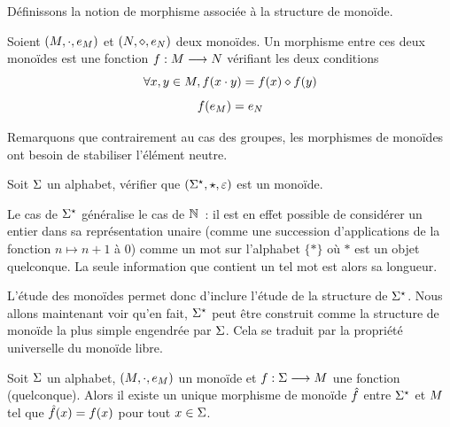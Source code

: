 \noindent
Définissons la notion de morphisme associée à la structure de monoïde.

\begin{definition}
  Soient $(M,\mathbin{\cdot},e_{M})$ et $(N,\mathbin{\diamond},e_{N})$ deux monoïdes. Un
  morphisme entre ces deux monoïdes est une fonction
  $f : \displaystyle M \longrightarrow N$ vérifiant les deux conditions
  \begin{equation*}
    \forall x,y\in M, f(x\mathbin{\cdot} y) = f(x)\mathbin{\diamond} f(y)
  \end{equation*}
  \begin{equation*}
    f(e_{M}) = e_{N}
  \end{equation*}
\end{definition}

Remarquons que contrairement au cas des groupes, les morphismes de monoïdes ont
besoin de stabiliser l'élément neutre.

\begin{exercise}
  Soit $\Sigma$ un alphabet, vérifier que $(\Sigma^{\star}, \mathbin{\star},\varepsilon)$ est un monoïde.
\end{exercise}

Le cas de $\Sigma^{\star}$ généralise le cas de $\mathbb N$~: il est en effet possible de
considérer un entier dans sa représentation unaire (comme une
succession d'applications de la fonction $n \mapsto n + 1$ à $0$) comme un mot
sur l'alphabet $\{*\}$ où $*$ est un objet quelconque. La seule information
que contient un tel mot est alors sa longueur.

L'étude des monoïdes permet donc d'inclure l'étude de la structure de
$\Sigma^{\star}$. Nous allons maintenant voir qu'en fait, $\Sigma^{\star}$ peut être construit
comme la structure de monoïde la plus simple engendrée par $\Sigma$. Cela se
traduit par la propriété universelle du monoïde libre.

\begin{theorem}\label{thm.PU.monoid}
  Soit $\Sigma$ un alphabet, $(M,\mathbin{\cdot},e_{M})$ un monoïde et
  $f : \displaystyle \Sigma \longrightarrow M$ une fonction (quelconque). Alors il existe un
  unique morphisme de monoïde $\hat{f}$ entre $\Sigma^{\star}$ et $M$ tel que
  $\hat{f}(x) = f(x)$ pour tout $x \in \Sigma$.
\end{theorem}

